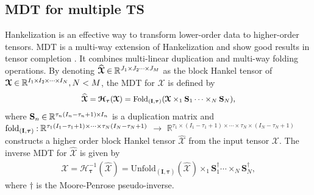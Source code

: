 \documentclass[letterpaper]{article} %
\numberwithin{theorem}{section}
\newcommand{\bm}{\boldsymbol}
\newcommand{\ten}[1]{ \boldsymbol{\mathcal #1}}
\newcommand{\bbR}[1]{\mathbb{R}^{#1}}
\begin{document}
\subsection{MDT for multiple  TS}
Hankelization is an effective way to transform  lower-order data to higher-order tensors.  MDT is a multi-way extension of Hankelization  and show good results in tensor completion  \cite{yokota2018missing,yokota2019manifold}. It combines  multi-linear duplication and multi-way folding operations.  By denoting $\widehat{\ten{X}}\hspace{-0.02cm}  \in \hspace{-0.02cm} \mathbb{R}^{J_1 \times\hspace{-0.02cm}  J_2 \hspace{-0.02cm} \cdots\hspace{-0.02cm}  \times\hspace{-0.02cm}  J_M}$ as the block Hankel tensor of   $\ten{X}\hspace{-0.02cm}   \in\hspace{-0.02cm}   \bbR{I_1 \hspace{-0.02cm}  \times \hspace{-0.02cm}  I_2 \hspace{-0.02cm}  \times\hspace{-0.02cm}   \cdots\hspace{-0.02cm}   \times \hspace{-0.02cm}  I_N}, N < M$, the  MDT  for  $\ten{X}$  is defined by
\begin{equation}\label{MDT}
\small 
\begin{aligned}
\widehat{\ten{X}} =\ten{H}_{\bm \tau}(\ten{X}) = \text{Fold}_{(\mathbf I, \bm \tau)} ( \ten{X} \times_1 \mathbf S_1 \cdots \times_N \mathbf S_N),
\end{aligned}
\end{equation}
where $\mathbf S_n\hspace{-0.02cm}  \in \hspace{-0.02cm}  \mathbb{R}^{\tau_n(I_n-\tau_n+1) \hspace{-0.02cm}  \times\hspace{-0.02cm}  I_n}$ is a duplication matrix  and  $\text{fold}_{(\mathbf I, \bm \tau)}\hspace{-0.02cm} :\hspace{-0.02cm}  \bbR{\tau_1(I_1-\tau_1+1) \times \cdots \times \tau_N(I_N-\tau_N+1)}$ $\rightarrow$ $\bbR{\tau_1 \times (I_1-\tau_1+1) \times \cdots \times \tau_N \times (I_N-\tau_N+1)}$ constructs a higher order block Hankel tensor $\widehat{ \ten{X}}$ from the input  tensor ${ \ten{X}}$.   The inverse MDT for  $\widehat{ \ten{X}}$ is given by 
\begin{equation} 
\begin{aligned}
{\ten{X}} = \mathcal{H}_{\bm \tau}^{-1}(\widehat{ \ten{X}}) = \text{Unfold}_{(\mathbf I, \bm \tau)}(\widehat{ \ten{X}}) \times_1 \mathbf S_1^\dagger \cdots \times_N \mathbf S_N^\dagger,
\end{aligned}
\end{equation}
where $\dagger$ is the  Moore-Penrose pseudo-inverse.
\end{document}
